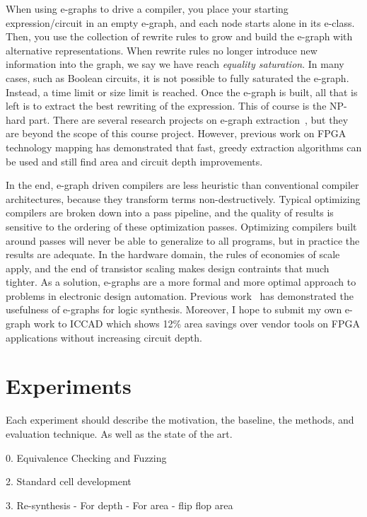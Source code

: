 \documentclass[10pt,letterpaper]{article}
\begin{document}
When using e-graphs to drive a compiler, you place your starting
expression/circuit in an empty e-graph, and each node starts alone in its
e-class. Then, you use the collection of rewrite rules to grow and build the
e-graph with alternative representations. When rewrite rules no longer
introduce new information into the graph, we say we have reach \textit{equality
    saturation}. In many cases, such as Boolean circuits, it is not possible to
fully saturated the e-graph. Instead, a time limit or size limit is reached.
Once the e-graph is built, all that is left is to extract the best rewriting of
the expression. This of course is the NP-hard part. There are several research
projects on e-graph extraction~\cite{smoothe,sparsextract}, but they are beyond
the scope of this course project. However, previous work on FPGA technology
mapping has demonstrated that fast, greedy extraction algorithms can be used
and still find area and circuit depth improvements.

In the end, e-graph driven compilers are less heuristic than conventional
compiler architectures, because they transform terms non-destructively. Typical
optimizing compilers are broken down into a pass pipeline, and the quality of
results is sensitive to the ordering of these optimization passes. Optimizing
compilers built around passes will never be able to generalize to all programs,
but in practice the results are adequate. In the hardware domain, the rules of
economies of scale apply, and the end of transistor scaling makes design
contraints that much tighter. As a solution, e-graphs are a more formal and
more optimal approach to problems in electronic design automation. Previous
work~\cite{esyn} has demonstrated the usefulness of e-graphs for logic
synthesis. Moreover, I hope to submit my own e-graph work to ICCAD which shows
12\% area savings over vendor tools on FPGA applications without increasing
circuit depth.

\section{Experiments}\label{sec:experiments}

Each experiment should describe the motivation, the baseline, the methods, and
evaluation technique. As well as the state of the art.

0. Equivalence Checking and Fuzzing

2. Standard cell development

3. Re-synthesis
- For depth
- For area
- flip flop area
\end{document}
